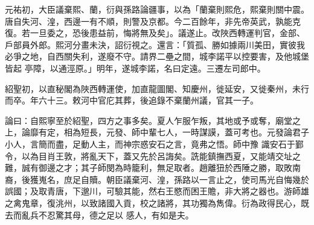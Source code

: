 \begin{pinyinscope}
 元祐初，大臣議棄熙、蘭，衍與孫路論疆事，以為「蘭棄則熙危，熙棄則關中震。唐自失河、湟，西邊一有不順，則警及京都。今二百餘年，非先帝英武，孰能克復。若一旦委之，恐後患益前，悔將無及矣」。議遂止。改陜西轉運判官，金部、戶部員外郎。熙河分畫未決，詔衍視之。還言：「質孤、勝如據兩川美田，實彼我必爭之地，自西關失利，遂廢不守。請界二壘之間，城李諾平以控要害，及他城堡皆起
 亭障，以通涇原。」明年，遂城李諾，名曰定遠。三遷左司郎中。



 紹聖初，以直秘閣為陜西轉運使，加直龍圖閣、知慶州，徙延安，又徙秦州，未行而卒。年六十三。敕河中官庀其葬，後追錄不棄蘭州議，官其一子。



 論曰：自熙寧至於紹聖，四方之事多矣。夏人乍服乍叛，其地或予或奪，廟堂之上，論靡有定，相為短長，元發、師中輩七人，一時謀謨，蓋可考也。元發論君子小人，言簡而盡，足動人主，而神宗惑安石之言，竟弗之悟。師中豫
 識安石于鄞令，以為目肖王敦，將亂天下，蓋又先於呂誨矣。詵能鎮撫西夏，又能靖交址之難，誠有御邊之才；其子師閔為時籠利，無足取者。趙離狃於西陲之勝，取敗南裔，後獲嵬名，庶足自贖。朝臣議棄河、湟，孫路以一言止之，使司馬光自悔幾於誤國；及取青唐，下邈川，可驗其能，然右王愍而困王贍，非大將之器也。游師雄之禽鬼章，復洮州，以致諸國入貢，校之諸將，其功獨為雋偉。衍為政得民心，既去而亂兵不忍驚其母，德之足以
 感人，有如是夫。



\end{pinyinscope}